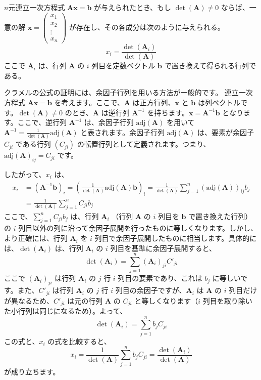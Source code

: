 \begin{thm}[クラメルの公式] \label{Cramer's_formula}
$n$元連立一次方程式 $\bm{A}\bm{x} = \bm{b}$ が与えられたとき、もし $\det(\bm{A}) \neq 0$ ならば、一意の解 $\bm{x} = \begin{pmatrix} x_1 \\ x_2 \\ \vdots \\ x_n \end{pmatrix}$ が存在し、その各成分は次のように与えられる。
\[ x_i = \frac{\det(\bm{A}_i)}{\det(\bm{A})} \]
ここで $\bm{A}_i$ は、行列 $\bm{A}$ の $i$ 列目を定数ベクトル $\bm{b}$ で置き換えて得られる行列である。
\begin{proof*}
クラメルの公式の証明には、余因子行列を用いる方法が一般的です。
連立一次方程式 $\bm{A}\bm{x} = \bm{b}$ を考えます。ここで、$\bm{A}$ は正方行列、$\bm{x}$ と $\bm{b}$ は列ベクトルです。$\det(\bm{A}) \neq 0$ のとき、$\bm{A}$ は逆行列 $\bm{A}^{-1}$ を持ちます。$\bm{x} = \bm{A}^{-1}\bm{b}$ となります。ここで、逆行列 $\bm{A}^{-1}$ は、余因子行列 $\text{adj}(\bm{A})$ を用いて $\bm{A}^{-1} = \frac{1}{\det(\bm{A})}\text{adj}(\bm{A})$ と表されます。余因子行列 $\text{adj}(\bm{A})$ は、要素が余因子 $C_{ji}$ である行列 $(C_{ji})$ の転置行列として定義されます。つまり、$\text{adj}(\bm{A})_{ij} = C_{ji}$ です。\par
したがって、$x_i$ は、
\begin{align*}
x_i &= (\bm{A}^{-1}\bm{b})_i = \left(\frac{1}{\det(\bm{A})}\text{adj}(\bm{A})\bm{b}\right)_i = \frac{1}{\det(\bm{A})} \sum_{j=1}^{n} (\text{adj}(\bm{A}))_{ij}b_j \\
&= \frac{1}{\det(\bm{A})} \sum_{j=1}^{n} C_{ji}b_j
\end{align*}
ここで、$\sum_{j=1}^{n} C_{ji}b_j$ は、行列 $\bm{A}_i$ （行列 $\bm{A}$ の $i$ 列目を $\bm{b}$ で置き換えた行列）の $i$ 列目以外の列に沿って余因子展開を行ったものに等しくなります。しかし、より正確には、行列 $\bm{A}_i$ を $i$ 列目で余因子展開したものに相当します。具体的には、$\det(\bm{A}_i)$ は、行列 $\bm{A}_i$ の $i$ 列目を基準に余因子展開すると、
\[ \det(\bm{A}_i) = \sum_{j=1}^{n} (\bm{A}_i)_{ji} C'_{ji} \]
ここで $(\bm{A}_i)_{ji}$ は行列 $\bm{A}_i$ の $j$ 行 $i$ 列目の要素であり、これは $b_j$ に等しいです。また、$C'_{ji}$ は行列 $\bm{A}_i$ の $j$ 行 $i$ 列目の余因子ですが、$\bm{A}_i$ は $\bm{A}$ の $i$ 列目だけが異なるため、$C'_{ji}$ は元の行列 $\bm{A}$ の $C_{ji}$ と等しくなります（$i$ 列目を取り除いた小行列は同じになるため）。よって、
\[ \det(\bm{A}_i) = \sum_{j=1}^{n} b_j C_{ji} \]
この式と、$x_i$ の式を比較すると、
\[ x_i = \frac{1}{\det(\bm{A})} \sum_{j=1}^{n} b_j C_{ji} = \frac{\det(\bm{A}_i)}{\det(\bm{A})} \]
が成り立ちます。
\end{proof*}
\end{thm}

